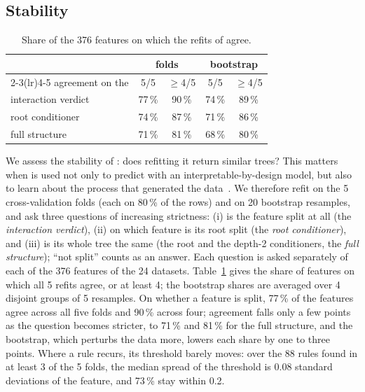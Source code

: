 \subsection{Stability}\label{sec:stability}
\begin{table}
\vspace{-1.2em}
\centering
\small
\setlength{\tabcolsep}{4pt}
\begin{tabular}{lcccc}
\toprule
& \multicolumn{2}{c}{folds} & \multicolumn{2}{c}{bootstrap} \\
\cmidrule(lr){2-3}\cmidrule(lr){4-5}
agreement on the & 5/5 & $\geq$4/5 & 5/5 & $\geq$4/5 \\
\midrule
interaction verdict & 77\,\% & 90\,\% & 74\,\% & 89\,\% \\
root conditioner & 74\,\% & 87\,\% & 71\,\% & 86\,\% \\
full structure & 71\,\% & 81\,\% & 68\,\% & 80\,\% \\
\bottomrule
\end{tabular}
\caption{Share of the 376 features on which the refits of \method{} agree.}
\label{tab:stability}
\vspace{-1em}
\end{table}
We assess the stability of \method{}: does refitting it return similar trees?
This matters when \method{} is used not only to predict with an interpretable-by-design model, but also to learn about the process that generated the data~\cite{philipp2018measuring, freiesleben2024scientific}.
We therefore refit \method{} on the 5 cross-validation folds (each on 80\,\% of the rows) and on 20 bootstrap resamples, and ask three questions of increasing strictness: (i) is the feature split at all (the \emph{interaction verdict}), (ii) on which feature is its root split (the \emph{root conditioner}), and (iii) is its whole tree the same (the root and the depth-2 conditioners, the \emph{full structure}); ``not split'' counts as an answer.
Each question is asked separately of each of the 376 features of the 24 datasets.
Table~\ref{tab:stability} gives the share of features on which all 5 refits agree, or at least 4; the bootstrap shares are averaged over 4 disjoint groups of 5 resamples.
On whether a feature is split, 77\,\% of the features agree across all five folds and 90\,\% across four; agreement falls only a few points as the question becomes stricter, to 71\,\% and 81\,\% for the full structure, and the bootstrap, which perturbs the data more, lowers each share by one to three points.
Where a rule recurs, its threshold barely moves: over the 88 rules found in at least 3 of the 5 folds, the median spread of the threshold is 0.08 standard deviations of the feature, and 73\,\% stay within 0.2.

